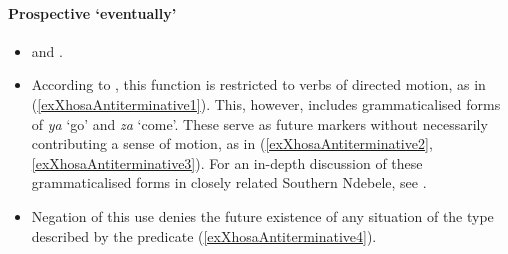 \paragraph{Prospective \lq eventually\rq{}}\label{appendixXhosaProspective}
\begin{itemize}
	\item \textcite[132]{McLaren1936} and \textcite[149]{GreaterDictionaryXhosa}.
	\item According to  \textcite[149]{GreaterDictionaryXhosa}, this function is restricted to verbs of directed motion, as in (\ref{exXhosaAntiterminative1}). This, however, includes grammaticalised forms of \textit{ya} \lq go' and \textit{za} \lq come'. These serve as future markers without necessarily contributing a sense of motion, as in (\ref{exXhosaAntiterminative2}, \ref{exXhosaAntiterminative3}). For an in-depth discussion of these grammaticalised forms in closely related Southern Ndebele, see \textcite{CraneMabena2019}.
	\item Negation of this use denies the future existence of any situation of the type described by the predicate (\ref{exXhosaAntiterminative4}).
\end{itemize}
